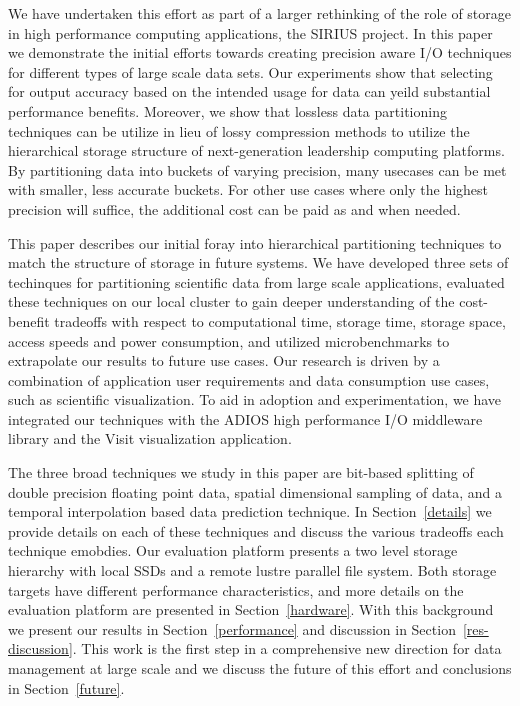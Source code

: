 \documentclass{sig-alt-gov2}
\begin{document}
We have undertaken this effort as part of a larger rethinking of the role of
storage in high performance computing applications, the SIRIUS project. In
this paper we demonstrate the initial efforts towards creating precision
aware I/O techniques for different types of large scale data sets. Our
experiments show that selecting for output accuracy based on the intended
usage for data can yeild substantial performance benefits. Moreover, we show
that lossless data partitioning techniques can be utilize in lieu of lossy
compression methods to utilize the hierarchical storage structure of
next-generation leadership computing platforms. By partitioning data into
buckets of varying precision, many usecases can be met with smaller, less
accurate buckets. For other use cases where only the highest precision will
suffice, the additional cost can be paid as and when needed.

This paper describes our initial foray into hierarchical partitioning techniques
to match the structure of storage in future systems. We have developed three
sets of techinques for partitioning scientific data from large scale
applications, evaluated these techniques on our local cluster to gain deeper
understanding of the cost-benefit tradeoffs with respect to computational time,
storage time, storage space, access speeds and power consumption, and utilized
microbenchmarks to extrapolate our results to future use cases. Our research is
driven by a combination of application user requirements and data consumption
use cases, such as scientific visualization. To aid in adoption and
experimentation, we have integrated our techniques with the ADIOS high
performance I/O middleware library and the Visit visualization application. 

The three broad techniques we study in this paper are bit-based splitting of
double precision floating point data, spatial dimensional sampling of data, and
a temporal interpolation based data prediction technique. In
Section~\ref{details} we provide details on each of these techniques and discuss
the various tradeoffs each technique emobdies. Our evaluation platform presents
a two level storage hierarchy with local SSDs and a remote lustre parallel file
system. Both storage targets have different performance characteristics, and
more details on the evaluation platform are presented in Section~\ref{hardware}.
With this background we present our results in Section~\ref{performance} and
discussion in Section~\ref{res-discussion}. This work is the first step in a
comprehensive new direction for data management at large scale and we discuss
the future of this effort and conclusions in Section~\ref{future}. 
\end{document}
